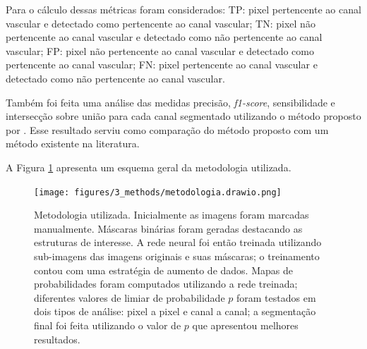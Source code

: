  Para o cálculo dessas métricas foram considerados: TP: pixel pertencente ao canal vascular e detectado como pertencente ao canal vascular; TN: pixel não pertencente ao canal vascular e detectado como não pertencente ao canal vascular; FP: pixel não pertencente ao canal vascular e detectado como pertencente ao canal vascular; FN: pixel pertencente ao canal vascular e detectado como não pertencente ao canal vascular.


Também foi feita uma análise das medidas precisão, \textit{f1-score}, sensibilidade e intersecção sobre união para cada canal segmentado utilizando o método proposto por \cite{gondim2021automatic}. Esse resultado serviu como comparação do método proposto com um método existente na literatura.


A Figura \ref{fig:methodology-schema} apresenta um esquema geral da metodologia utilizada.



\begin{landscape}

\begin{figure}[h]
    \center
    \texttt{[image: figures/3\_methods/metodologia.drawio.png]}   
  
    \caption[Diagrama do método proposto.]{Metodologia utilizada. Inicialmente as imagens foram marcadas manualmente. Máscaras binárias foram geradas destacando as estruturas de interesse. A rede neural foi então treinada utilizando sub-imagens das imagens originais e suas máscaras; o treinamento contou com uma estratégia de aumento de dados. Mapas de probabilidades foram computados utilizando a rede treinada; diferentes valores de limiar de probabilidade $p$ foram testados em dois tipos de análise: pixel a pixel e canal a canal; a segmentação final foi feita utilizando o valor de $p$ que apresentou melhores resultados. }
    \label{fig:methodology-schema}
\end{figure}

\end{landscape}

